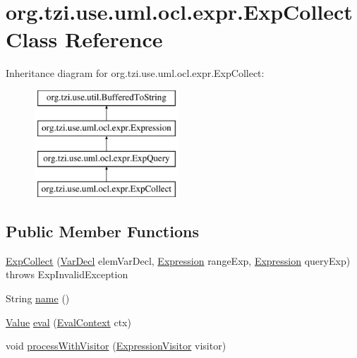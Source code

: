 \hypertarget{classorg_1_1tzi_1_1use_1_1uml_1_1ocl_1_1expr_1_1_exp_collect}{\section{org.\-tzi.\-use.\-uml.\-ocl.\-expr.\-Exp\-Collect Class Reference}
\label{classorg_1_1tzi_1_1use_1_1uml_1_1ocl_1_1expr_1_1_exp_collect}
}
Inheritance diagram for org.\-tzi.\-use.\-uml.\-ocl.\-expr.\-Exp\-Collect\-:\begin{figure}[H]
\begin{center}
\leavevmode
\includegraphics[height=4.000000cm]{classorg_1_1tzi_1_1use_1_1uml_1_1ocl_1_1expr_1_1_exp_collect}
\end{center}
\end{figure}
\subsection*{Public Member Functions}
\begin{DoxyCompactItemize}
\item 
\hyperlink{classorg_1_1tzi_1_1use_1_1uml_1_1ocl_1_1expr_1_1_exp_collect_a6bc12cd477e1ef1c0410bcc4d78730ed}{Exp\-Collect} (\hyperlink{classorg_1_1tzi_1_1use_1_1uml_1_1ocl_1_1expr_1_1_var_decl}{Var\-Decl} elem\-Var\-Decl, \hyperlink{classorg_1_1tzi_1_1use_1_1uml_1_1ocl_1_1expr_1_1_expression}{Expression} range\-Exp, \hyperlink{classorg_1_1tzi_1_1use_1_1uml_1_1ocl_1_1expr_1_1_expression}{Expression} query\-Exp)  throws Exp\-Invalid\-Exception     
\item 
String \hyperlink{classorg_1_1tzi_1_1use_1_1uml_1_1ocl_1_1expr_1_1_exp_collect_a6544b6bc61bd7a7576beae73e2df0346}{name} ()
\item 
\hyperlink{classorg_1_1tzi_1_1use_1_1uml_1_1ocl_1_1value_1_1_value}{Value} \hyperlink{classorg_1_1tzi_1_1use_1_1uml_1_1ocl_1_1expr_1_1_exp_collect_a6bdf34f95934f63e87342a059b54d203}{eval} (\hyperlink{classorg_1_1tzi_1_1use_1_1uml_1_1ocl_1_1expr_1_1_eval_context}{Eval\-Context} ctx)
\item 
void \hyperlink{classorg_1_1tzi_1_1use_1_1uml_1_1ocl_1_1expr_1_1_exp_collect_a5853c097a6cfcc9659c37a7d43a3f600}{process\-With\-Visitor} (\hyperlink{interfaceorg_1_1tzi_1_1use_1_1uml_1_1ocl_1_1expr_1_1_expression_visitor}{Expression\-Visitor} visitor)
\end{DoxyCompactItemize}
